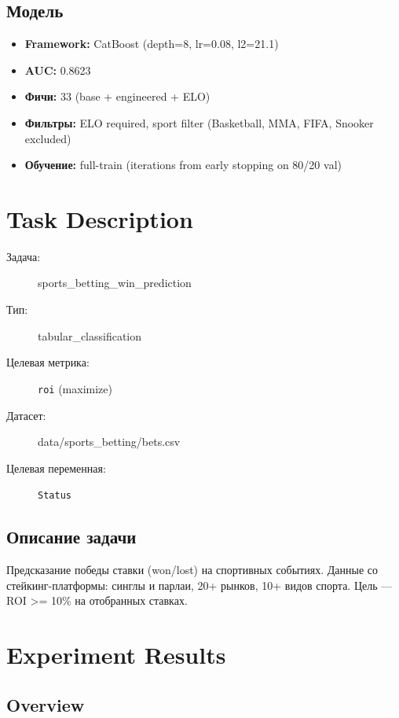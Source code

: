 \documentclass[12pt,a4paper]{article}
\begin{document}
\subsection{Модель}
\begin{itemize}
  \item \textbf{Framework:} CatBoost (depth=8, lr=0.08, l2=21.1)
  \item \textbf{AUC:} 0.8623
  \item \textbf{Фичи:} 33 (base + engineered + ELO)
  \item \textbf{Фильтры:} ELO required, sport filter (Basketball, MMA, FIFA, Snooker excluded)
  \item \textbf{Обучение:} full-train (iterations from early stopping on 80/20 val)
\end{itemize}




\section{Task Description}

\begin{description}
    \item[Задача:] sports\_betting\_win\_prediction
    \item[Тип:] tabular\_classification
    \item[Целевая метрика:] \texttt{roi}
        (maximize)
    \item[Датасет:] data/sports\_betting/bets.csv
    \item[Целевая переменная:] \texttt{Status}
\end{description}

\subsection*{Описание задачи}
Предсказание победы ставки (won/lost) на спортивных событиях. Данные со стейкинг-платформы: синглы и парлаи, 20+ рынков, 10+ видов спорта. Цель — ROI >= 10\% на отобранных ставках.




\section{Experiment Results}

\subsection{Overview}
\end{document}
